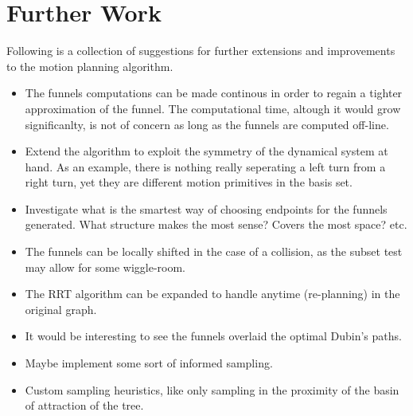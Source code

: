 \chapter{Further Work}

Following is a collection of suggestions for further extensions and improvements
to the \rrtfunnel{} motion planning algorithm.

\begin{itemize}

\item The funnels computations can be made continous in order to regain a
  tighter approximation of the funnel. The computational time, altough it would
  grow significanlty, is not of concern as long as the funnels are computed
  off-line.

\item Extend the algorithm to exploit the symmetry of the dynamical system at
  hand. As an example, there is nothing really seperating a left turn from a
  right turn, yet they are different motion primitives in the basis set.


  \item  Investigate what is the smartest way of choosing endpoints for the
    funnels generated. What structure makes the most sense? Covers the most
    space? etc.

  \item The funnels can be locally shifted in the case of a collision, as the
    subset test may allow for some wiggle-room.

  \item The RRT algorithm can be expanded to handle anytime (re-planning) in the
    original graph.

  \item It would be interesting to see the funnels overlaid the optimal Dubin's paths.

  \item Maybe implement some sort of informed sampling.

  \item Custom sampling heuristics, like only sampling in the proximity of the
    basin of attraction of the tree.

\end{itemize}